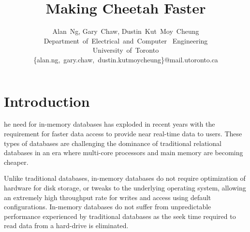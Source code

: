 \documentclass[11pt,journal,compsoc]{IEEEtran}
\begin{document}
%
\title{Making Cheetah Faster}

\author{Alan~Ng,
        Gary~Chaw,
        Dustin~Kut~Moy~Cheung\vspace{5 mm}\\Department~of~Electrical~and~Computer~
    Engineering\\University~of~Toronto\\\{alan.ng,~gary.chaw,~dustin.kutmoycheung\}@mail.utoronto.ca}

\maketitle

\IEEEdisplaynotcompsoctitleabstractindextext

\IEEEpeerreviewmaketitle

\section{Introduction}
he need for in-memory databases has exploded in recent years with the
requirement for faster data access to provide near real-time data to users. These types of databases are challenging the dominance of traditional relational databases in an era where multi-core processors and main memory are becoming cheaper.


Unlike traditional databases, in-memory databases do not require optimization of hardware for disk storage, or tweaks to the underlying operating system, allowing an extremely high throughput rate for writes and access using default configurations. In-memory databases do not suffer from unpredictable performance experienced by traditional databases as the seek time required to read data from a hard-drive is eliminated.
\end{document}
